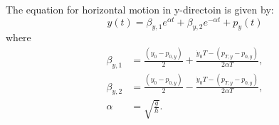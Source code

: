 \documentclass{article}
\begin{document}
The equation for horizontal motion in y-directoin is given by:
\begin{equation}
y(t) = \beta_{y, 1} e^{\alpha t} + \beta_{y, 2} e^{-\alpha t} + p_y(t)
\end{equation}
where
\begin{align*}
    \beta_{y, 1} &= \frac{(y_0 - p_{0, y})}{2} + \frac{\dot{y}_0 T - (p_{T, y} - p_{0, y})}{2 \alpha T}, \\
    \beta_{y, 2} &= \frac{(y_0 - p_{0, y})}{2} - \frac{\dot{y}_0 T - (p_{T, y} - p_{0, y})}{2 \alpha T}, \\
    \alpha &= \sqrt{\frac{g}{h}}.
\end{align*}
\end{document}
